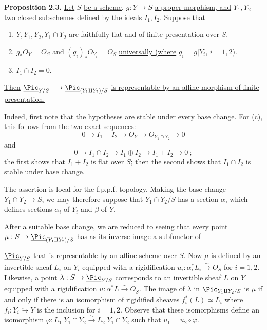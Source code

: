 \textbf{Proposition 2.3.} \uline{Let} \(S\) \uline{be a scheme,} \(g:Y\to S\) \uline{a proper morphism, and} \(Y_1,Y_2\) \uline{two closed subschemes defined by the ideals} \(I_1,I_2\)\uline{. Suppose that}
\begin{enumerate}[label=\alph*)]
\item \(Y,Y_1,Y_2,Y_1\cap Y_2\) \uline{are faithfully flat and of finite presentation over} \(S\).
\item \(g_*{O}_Y={O}_S\) and \((g_i)_*{O}_{Y_i}={O}_S\) \uline{universally (where} \(g_i=g|Y_i\), \(i=1,2\)).
\item \(I_1\cap I_2=0\).
\end{enumerate}
\uline{Then} \(\underline{\Pic}_{Y/S}\longrightarrow \underline{\Pic}_{(Y_1\amalg Y_2)/S}\) \uline{is representable by an affine morphism of finite presentation.}

Indeed, first note that the hypotheses are stable under every base change. For (c), this follows from the two exact sequences:
\[
  0\longrightarrow I_1+I_2\longrightarrow{O}_Y
  \longrightarrow{O}_{Y_1\cap Y_2}\longrightarrow0
\]
and
\[
  0\longrightarrow I_1\cap I_2\longrightarrow I_1\oplus I_2
  \longrightarrow I_1+I_2\longrightarrow0~;
\]
the first shows that \(I_1+I_2\) is flat over \(S\); then the second shows that \(I_1\cap I_2\) is stable under base change.

The assertion is local for the f.p.p.f. topology. Making the base change \(Y_1\cap Y_2\to S\), we may therefore suppose that \(Y_1\cap Y_2/S\) has a section \(\alpha\), which defines sections \(\alpha_i\) of \(Y_i\) and \(\beta\) of \(Y\).

After a suitable base change, we are reduced to seeing that every point \(\mu:S\to\underline{\Pic}_{(Y_1\amalg Y_2)/S}\) has as its inverse image a subfunctor of


%
\(\underline{\Pic}_{Y/S}\) that is representable by an affine scheme over \(S\). Now \(\mu\) is defined by an invertible sheaf \(L_i\) on \(Y_i\) equipped with a rigidification \(u_i:\alpha_i^*L_i\xrightarrow{\sim}{O}_S\) for \(i=1,2\). Likewise, a point \(\lambda:S\to\underline{\Pic}_{Y/S}\) corresponds to an invertible sheaf \(L\) on \(Y\) equipped with a rigidification \(u:\alpha^*L\xrightarrow{\sim}{O}_S\). The image of \(\lambda\) in \(\Pic_{Y_1\amalg Y_2/S}\) is \(\mu\) if and only if there is an isomorphism of rigidified sheaves \(f_i^*(L)\simeq L_i\) where \(f_i:Y_i\hookrightarrow Y\) is the inclusion for \(i=1,2\). Observe that these isomorphisms define an isomorphism \(\varphi:L_1|Y_1\cap Y_2\xrightarrow{\sim}L_2|Y_1\cap Y_2\) such that \(u_1=u_2\circ\varphi\).

